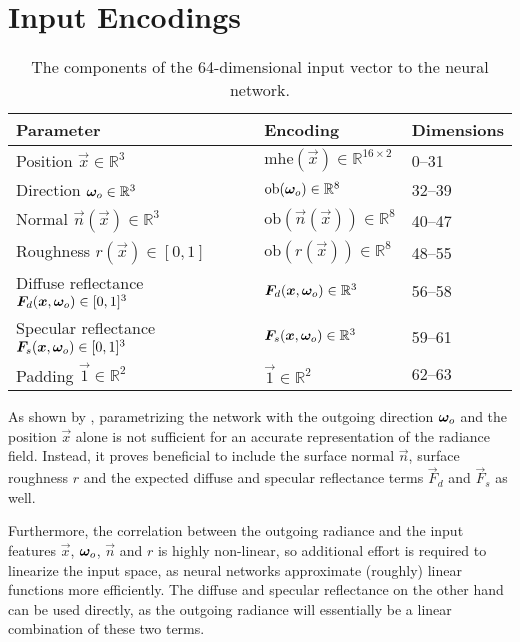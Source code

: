 \section{Input Encodings}
\begin{table}
    \centering
    \begin{tabular}{l l l}
        \textbf{Parameter} & \textbf{Encoding} & \textbf{Dimensions} \\
        \midrule
        Position $\vec{x} \in \mathbb{R}^3$ & $\mathrm{mhe}(\vec{x}) \in \mathbb{R}^{16 \times 2}$ & 0--31 \\
        Direction $\bm{\omega}_o \in \mathbb{R}^3$ & $\mathrm{ob}(\bm{\omega}_o) \in \mathbb{R}^{8}$ & 32--39 \\
        Normal $\vec{n}(\vec{x}) \in \mathbb{R}^3$ & $\mathrm{ob}(\vec{n}(\vec{x})) \in \mathbb{R}^{8}$ & 40--47 \\
        Roughness $r(\vec{x}) \in [0,1]$ & $\mathrm{ob}(r(\vec{x})) \in \mathbb{R}^{8}$ & 48--55 \\
        Diffuse reflectance $\bm{F}_d(\bm{x}, \bm{\omega}_o) \in [0,1]^3$ & $\bm{F}_d(\bm{x}, \bm{\omega}_o) \in \mathbb{R}^{3}$ & 56--58 \\
        Specular reflectance $\bm{F}_s(\bm{x}, \bm{\omega}_o) \in [0,1]^3$ & $\bm{F}_s(\bm{x}, \bm{\omega}_o) \in \mathbb{R}^{3}$ & 59--61 \\
        Padding $\vec{1} \in \mathbb{R}^2$ & $\vec{1} \in \mathbb{R}^2$ & 62--63 \\
    \end{tabular}
    \caption{The components of the 64-dimensional input vector to the neural network.}
    \label{tab:input-encoding}
\end{table}
As shown by \textcite{ren2013}, parametrizing the network with the outgoing direction $\bm{\omega}_o$ and the position $\vec{x}$ alone is not sufficient for an accurate representation of the radiance field.
Instead, it proves beneficial to include the surface normal $\vec{n}$, surface roughness $r$ and the expected diffuse and specular reflectance terms $\vec{F}_d$ and $\vec{F}_s$ as well.

Furthermore, the correlation between the outgoing radiance and the input features $\vec{x}$, $\bm{\omega}_o$, $\vec{n}$ and $r$ is highly non-linear, so additional effort is required to linearize the input space, as neural networks approximate (roughly) linear functions more efficiently.
The diffuse and specular reflectance on the other hand can be used directly, as the outgoing radiance will essentially be a linear combination of these two terms.

